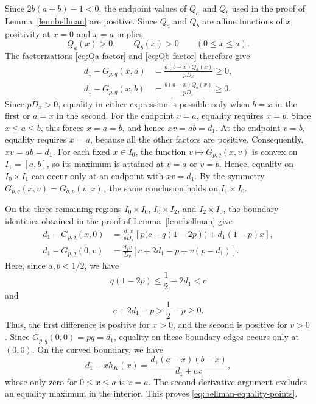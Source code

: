 \documentclass[11pt]{article}
\numberwithin{equation}{section}
\theoremstyle{definition}
\theoremstyle{remark}
\begin{document}
Since $2b(a+b)-1<0$, the endpoint values of $Q_a$ and $Q_b$ used in the proof
of Lemma~\ref{lem:bellman} are positive. Since $Q_a$ and $Q_b$ are affine functions of $x$, positivity at
$x=0$ and $x=a$ implies
\[
 Q_a(x)>0,
 \qquad
 Q_b(x)>0
 \qquad (0\leq x\leq a).
\]
The factorizations \eqref{eq:Qa-factor} and
\eqref{eq:Qb-factor} therefore give
\begin{align*}
 d_1-G_{p,q}(x,a)
 &=
 \frac{a(b-x)Q_a(x)}{pD_x}\geq0,\\
 d_1-G_{p,q}(x,b)
 &=
 \frac{b(a-x)Q_b(x)}{pD_x}\geq0.
\end{align*}
Since $pD_x>0$, equality in either expression is possible only when
$b=x$ in the first or $a=x$ in the second.  For the endpoint $v=a$, equality requires $x=b$.  Since
$x\leq a\leq b$, this forces $x=a=b$, and hence $xv=ab=d_1$.
At the endpoint $v=b$, equality requires
$x=a$, because all the other factors are positive.  Consequently,
$xv=ab=d_1$.
For each fixed $x\in I_0$, the function
$v\mapsto G_{p,q}(x,v)$ is convex on $I_1=[a,b]$, so its maximum is
attained at $v=a$ or $v=b$.  Hence, equality on
$I_0\times I_1$ can occur only at an endpoint with $xv=d_1$.
By the symmetry
$
 G_{p,q}(x,v)=G_{q,p}(v,x),
$
the same conclusion holds on $I_1\times I_0$.

On the three remaining regions
$I_0\times I_0$, $I_0\times I_2$, and $I_2\times I_0$, the boundary
identities obtained in the proof of Lemma~\ref{lem:bellman} give
\begin{align*}
 d_1-G_{p,q}(x,0)
 &=
 \frac{d_1x}{pD_x}
 \left[
  p\bigl(c-q(1-2p)\bigr)+d_1(1-p)x
 \right],\\
 d_1-G_{p,q}(0,v)
 &=
 \frac{d_1v}{D_v}
 \left[
  c+2d_1-p+v(p-d_1)
 \right].
\end{align*}
Here,  since $a, b<1/2$, we have
\[
 q(1-2p)\leq\frac12-2d_1<c
\]
and
\[
 c+2d_1-p>\frac12-p\geq0.
\]
Thus, the first difference is positive for $x>0$, and the second is
positive for $v>0$.  Since $G_{p,q}(0,0)=pq=d_1$, equality on these
boundary edges occurs only at $(0,0)$.
On the curved boundary, we have
\begin{equation*}
 d_1-xh_K(x)
 =
 \frac{d_1(a-x)(b-x)}{d_1+cx},
\end{equation*}
whose only zero for $0\leq x\leq a$ is $x=a$. The second-derivative
argument excludes an equality maximum in the interior. This proves
\eqref{eq:bellman-equality-points}.
\end{document}
